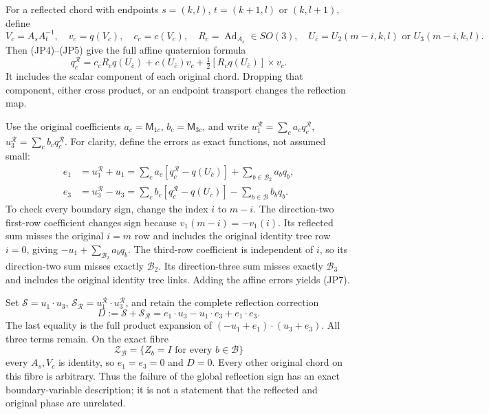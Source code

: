 \documentclass[11pt]{article}
\begin{document}
For a reflected chord with endpoints \(s=(k,l)\), \(t=(k+1,l)\)
or \((k,l+1)\), define
\[
 V_c=A_sA_t^{-1},\quad v_c=q(V_c),\quad c_c=c(V_c),\quad
 R_c=\operatorname{Ad}_{A_s}\in SO(3),\quad
 U_{\bar c}=U_2(m-i,k,l)\text{ or }U_3(m-i,k,l).
\]
Then (JP4)–(JP5) give the full affine quaternion formula
\[
\boxed{
 q_c^{\mathcal R}
 =c_cR_cq(U_{\bar c})+c(U_{\bar c})v_c
       +\tfrac12[R_cq(U_{\bar c})]\times v_c.}
\tag{JP6}
\]
It includes the scalar component of each original chord. Dropping that
component, either cross product, or an endpoint transport changes the
reflection map.

Use the original coefficients \(a_c=\mathsf M_{1c}\),
\(b_c=\mathsf M_{3c}\), and write
\(u_1^{\mathcal R}=\sum_ca_cq_c^{\mathcal R}\),
\(u_3^{\mathcal R}=\sum_cb_cq_c^{\mathcal R}\).
For clarity, define the errors as exact functions, not assumed small:
\[
\begin{aligned}
 e_1&=u_1^{\mathcal R}+u_1
   =\sum_ca_c[q_c^{\mathcal R}-q(U_{\bar c})]
       +\sum_{b\in\mathcal B_2}a_bq_b,\\
 e_3&=u_3^{\mathcal R}-u_3
   =\sum_cb_c[q_c^{\mathcal R}-q(U_{\bar c})]
       -\sum_{b\in\mathcal B}b_bq_b.
\end{aligned}\tag{JP7}
\]
To check every boundary sign, change the index \(i\) to \(m-i\).
The direction-two first-row coefficient changes sign because
\(v_1(m-i)=-v_1(i)\). Its reflected sum misses the original \(i=m\)
row and includes the original identity tree row \(i=0\), giving
\(-u_1+\sum_{\mathcal B_2}a_bq_b\). The third-row coefficient is
independent of \(i\), so its direction-two sum misses exactly
\(\mathcal B_2\). Its direction-three sum misses exactly
\(\mathcal B_3\) and includes the original identity tree links.
Adding the affine errors yields (JP7).

Set \(\mathcal S=u_1\cdot u_3\),
\(\mathcal S_{\mathcal R}=u_1^{\mathcal R}\cdot u_3^{\mathcal R}\),
and retain the complete reflection correction
\[
 D:=\mathcal S+\mathcal S_{\mathcal R}
   =e_1\cdot u_3-u_1\cdot e_3+e_1\cdot e_3.
 \tag{JP8}
\]
The last equality is the full product expansion of
\((-u_1+e_1)\cdot(u_3+e_3)\). All three terms remain.
On the exact fibre
\[
 \mathcal Z_{\mathcal B}
   =\{Z_b=I\text{ for every }b\in\mathcal B\}
\]
every \(A_s,V_c\) is identity, so \(e_1=e_3=0\) and \(D=0\).
Every other original chord on this fibre is arbitrary. Thus the failure
of the global reflection sign has an exact boundary-variable description;
it is not a statement that the reflected and original phase are unrelated.
\end{document}
